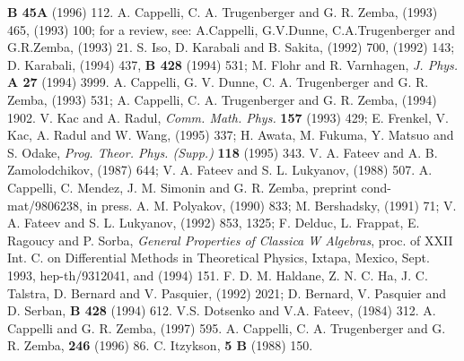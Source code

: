 \begin{thebibliography}{99}
                 {\bf B 45A} (1996) 112.
  A. Cappelli, C. A. Trugenberger and G. R. Zemba,
                 (1993) 465,  (1993) 100;
                for a review, see:
                A.Cappelli, G.V.Dunne, C.A.Trugenberger and G.R.Zemba,
                 (1993) 21.
S. Iso, D. Karabali and B. Sakita,
                 (1992) 700,  (1992) 143;
                D. Karabali,  (1994) 437, {\bf B 428} (1994) 
		531; M. Flohr and R. Varnhagen, {\it J. Phys.} {\bf A 27}
                (1994) 3999.
 A. Cappelli, G. V. Dunne, C. A. Trugenberger and G. R.
                Zemba,  (1993) 531;
                A. Cappelli, C. A. Trugenberger and G. R. Zemba,
                 (1994) 1902.
   V. Kac and A. Radul, {\it Comm. Math. Phys.} {\bf 157}
                (1993) 429; E. Frenkel, V. Kac, A. Radul and W. Wang,
                 (1995) 337;
                 H. Awata, M. Fukuma, Y. Matsuo and
                S. Odake, {\it Prog. Theor. Phys. (Supp.)} {\bf 118}
                (1995) 343.  
    V. A. Fateev and A. B. Zamolodchikov,  (1987)
                644; V. A. Fateev and S. L. Lukyanov,  (1988)
                507.
  A. Cappelli, C. Mendez, J. M. Simonin and G. R. Zemba,
                preprint cond-mat/9806238,  in press.
A. M. Polyakov,  (1990) 833; M. Bershadsky, 
                 (1991) 71; V. A. Fateev and 
                S. L. Lukyanov,  (1992) 853, 1325;
                F. Delduc, L. Frappat, E. Ragoucy and P. Sorba, 
                {\it General Properties of Classica W Algebras},
                proc. of XXII Int. C. on Differential Methods in Theoretical
                Physics, Ixtapa, Mexico, Sept. 1993,
                hep-th/9312041, and  (1994) 151.
F. D. M. Haldane, Z. N. C. Ha, J. C. Talstra,
                D. Bernard and V. Pasquier,  (1992) 2021;
                D. Bernard, V. Pasquier and D. Serban, \NP 
                {\bf B 428} (1994) 612.
  V.S. Dotsenko and V.A. Fateev,  (1984) 312.
    A. Cappelli and G. R. Zemba,  (1997) 595.
  A. Cappelli, C. A. Trugenberger and G. R. Zemba, \AP
                {\bf 246} (1996) 86.
   C. Itzykson,  {\bf 5 B} (1988) 150.

\end{thebibliography}

